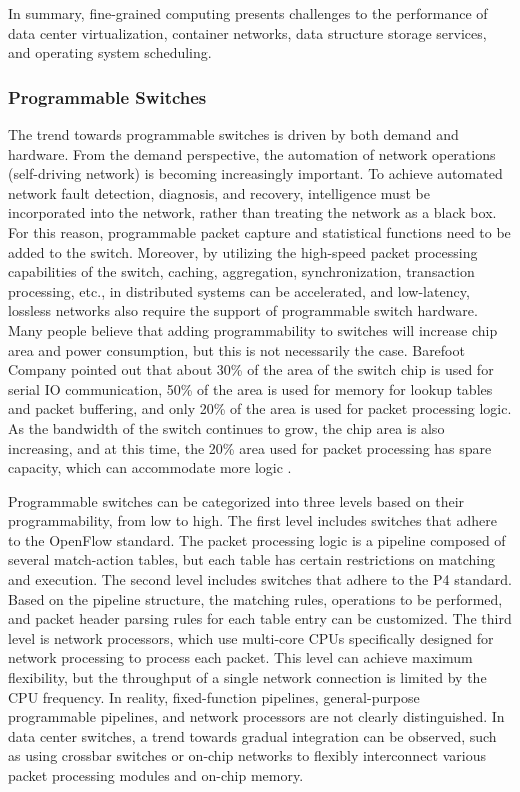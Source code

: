 In summary, fine-grained computing presents challenges to the performance of data center virtualization, container networks, data structure storage services, and operating system scheduling.

\subsubsection{Programmable Switches}

The trend towards programmable switches is driven by both demand and hardware. From the demand perspective, the automation of network operations (self-driving network) is becoming increasingly important. To achieve automated network fault detection, diagnosis, and recovery, intelligence must be incorporated into the network, rather than treating the network as a black box. For this reason, programmable packet capture and statistical functions need to be added to the switch. Moreover, by utilizing the high-speed packet processing capabilities of the switch, caching, aggregation, synchronization, transaction processing, etc., in distributed systems can be accelerated, and low-latency, lossless networks also require the support of programmable switch hardware. Many people believe that adding programmability to switches will increase chip area and power consumption, but this is not necessarily the case. Barefoot Company pointed out that about 30\% of the area of the switch chip is used for serial IO communication, 50\% of the area is used for memory for lookup tables and packet buffering, and only 20\% of the area is used for packet processing logic. As the bandwidth of the switch continues to grow, the chip area is also increasing, and at this time, the 20\% area used for packet processing has spare capacity, which can accommodate more logic \cite{barefoot-programmable}.

Programmable switches can be categorized into three levels based on their programmability, from low to high. The first level includes switches that adhere to the OpenFlow standard. The packet processing logic is a pipeline composed of several match-action tables, but each table has certain restrictions on matching and execution. The second level includes switches that adhere to the P4 standard. Based on the pipeline structure, the matching rules, operations to be performed, and packet header parsing rules for each table entry can be customized. The third level is network processors, which use multi-core CPUs specifically designed for network processing to process each packet. This level can achieve maximum flexibility, but the throughput of a single network connection is limited by the CPU frequency. In reality, fixed-function pipelines, general-purpose programmable pipelines, and network processors are not clearly distinguished. In data center switches, a trend towards gradual integration can be observed, such as using crossbar switches or on-chip networks to flexibly interconnect various packet processing modules and on-chip memory.

